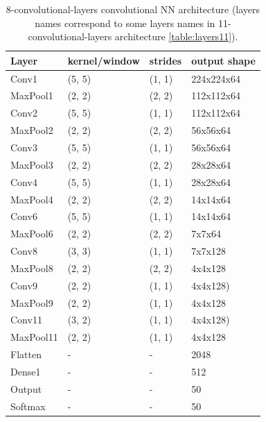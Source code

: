 \documentclass[a4paper]{article}
\begin{document}
\begin{table}[!h]
    \caption{ 8-convolutional-layers convolutional NN architecture (layers names correspond to some layers names in 11-convolutional-layers architecture \ref{table:layers11}).
    \label{table:layers8}
    }
\begin{center}
    \begin{tabular}{| l | l | l | l |}
    \hline
        Layer & kernel/window& strides & output shape\\
    \hline
        Conv1  & (5, 5)&        (1, 1)&     224x224x64  \\
    \hline
        MaxPool1 & (2, 2)&      (2, 2)&     112x112x64  \\
        Conv2  & (5, 5)&        (1, 1)&     112x112x64  \\
    \hline
        MaxPool2 & (2, 2)&      (2, 2)&     56x56x64    \\
        Conv3  & (5, 5)&        (1, 1)&     56x56x64    \\
    \hline
        MaxPool3 & (2, 2)&      (2, 2)&     28x28x64    \\
        Conv4  & (5, 5)&        (1, 1)&     28x28x64  \\
    \hline
        MaxPool4 & (2, 2)&      (2, 2)&     14x14x64  \\
        Conv6  & (5, 5)&        (1, 1)&     14x14x64  \\
    \hline
        MaxPool6 & (2, 2)&      (2, 2)&     7x7x64  \\
        Conv8  & (3, 3)&        (1, 1)&     7x7x128\\
    \hline
        MaxPool8 & (2, 2)&      (2, 2)&     4x4x128  \\
        Conv9  & (2, 2)&        (1, 1)&     4x4x128)\\
    \hline
        MaxPool9 & (2, 2)&      (1, 1)&     4x4x128  \\
        Conv11 & (3, 2)&        (1, 1)&     4x4x128)\\  %
    \hline
        MaxPool11 & (2, 2)&      (1, 1)&     4x4x128  \\
        Flatten & - & - & 2048 \\
        Dense1 & - & - & 512 \\
    \hline
        Output & - & - & 50 \\
        Softmax & - & - & 50 \\
    \hline
    \end{tabular}
\end{center}
\end{table}
\end{document}

